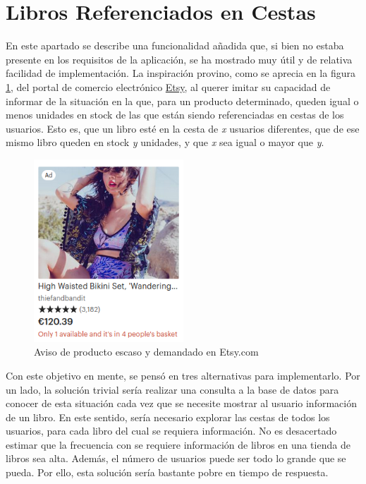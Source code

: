 \documentclass[a4paper,12pt,twoside,openright]{report}
\begin{document}
    \section{Libros Referenciados en Cestas}
    En este apartado se describe una funcionalidad añadida que, si bien no estaba presente en los requisitos de la aplicación, se ha mostrado muy útil y de relativa facilidad de implementación. La inspiración provino, como se aprecia en la figura \ref{fig:etsy}, del portal de comercio electrónico \href{https://www.etsy.com}{Etsy}, al querer imitar su capacidad de informar de la situación en la que, para un producto determinado, queden igual o menos unidades en stock de las que están siendo referenciadas en cestas de los usuarios. Esto es, que un libro esté en la cesta de \emph{x} usuarios diferentes, que de ese mismo libro queden en stock \emph{y} unidades, y que \emph{x} sea igual o mayor que \emph{y}.
    
    \begin{figure}[htb!]
    	\centering
    	\includegraphics[width=0.5\textwidth]{etsy}
    	\caption{Aviso de producto escaso y demandado en Etsy.com}
    	\label{fig:etsy}
    \end{figure}
    
    Con este objetivo en mente, se pensó en tres alternativas para implementarlo. Por un lado, la solución trivial sería realizar una consulta a la base de datos para conocer de esta situación cada vez que se necesite mostrar al usuario información de un libro. En este sentido, sería necesario explorar las cestas de todos los usuarios, para cada libro del cual se requiera información. No es desacertado estimar que la frecuencia con se requiere información de libros en una tienda de libros sea alta. Además, el número de usuarios puede ser todo lo grande que se pueda. Por ello, esta solución sería bastante pobre en tiempo de respuesta.
    
\end{document}
